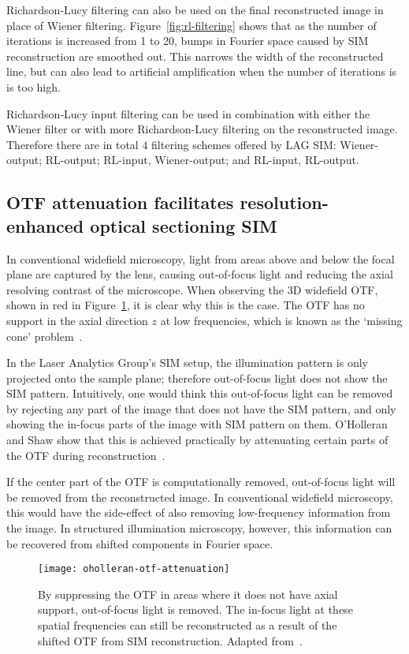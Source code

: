 Richardson-Lucy filtering can also be used on the final reconstructed image in place of Wiener filtering. 
Figure~\ref{fig:rl-filtering} shows that as the number of iterations is increased from 1 to 20, bumps in Fourier space caused by SIM reconstruction are smoothed out. 
This narrows the width of the reconstructed line, but can also lead to artificial amplification when the number of iterations is is too high. 

Richardson-Lucy input filtering can be used in combination with either the Wiener filter or with more Richardson-Lucy filtering on the reconstructed image. 
Therefore there are in total 4 filtering schemes offered by LAG SIM: Wiener-output; RL-output; RL-input, Wiener-output; and RL-input, RL-output. 

\subsection{OTF attenuation facilitates resolution-enhanced optical sectioning SIM}
In conventional widefield microscopy, light from areas above and below the focal plane are captured by the lens, causing out-of-focus light and reducing the axial resolving contrast of the microscope. 
When observing the 3D widefield OTF, shown in red in Figure~\ref{fig:oholleran-otf}, it is clear why this is the case. 
The OTF has no support in the axial direction $z$ at low frequencies, which is known as the `missing cone' problem~\cite{sheppard1992significance}. 

In the Laser Analytics Group's SIM setup, the illumination pattern is only projected onto the sample plane; therefore out-of-focus light does not show the SIM pattern.
Intuitively, one would think this out-of-focus light can be removed by rejecting any part of the image that does not have the SIM pattern, and only showing the in-focus parts of the image with SIM pattern on them. 
O'Holleran and Shaw show that this is achieved practically by attenuating certain parts of the OTF during reconstruction~\cite{oholleran2014optimized}.

If the center part of the OTF is computationally removed, out-of-focus light will be removed from the reconstructed image.
In conventional widefield microscopy, this would have the side-effect of also removing low-frequency information from the image. 
In structured illumination microscopy, however, this information can be recovered from shifted components in Fourier space. 

\begin{figure}[htbp!]
\centering
\texttt{[image: oholleran-otf-attenuation]}
\caption[LAG SIM: OTF attenuation]{By suppressing the OTF in areas where it does not have axial support, out-of-focus light is removed. The in-focus light at these spatial frequencies can still be reconstructed as a result of the shifted OTF from SIM reconstruction. Adapted from~\cite{oholleran2014optimized}. }
\label{fig:oholleran-otf}
\end{figure}

